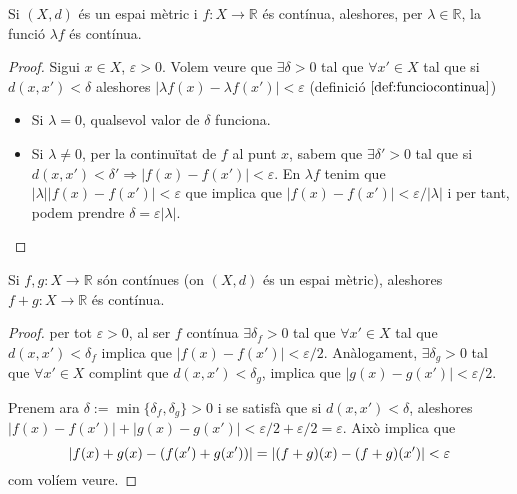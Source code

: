 \documentclass[../main.tex]{subfiles}
\begin{document}
\begin{prop}
\label{prop:funciocontinuaperescalar} Si $(X,d)$ és un espai mètric i $f:X\rightarrow \mathbb{R}$ és contínua, aleshores, per $\lambda\in\mathbb{R}$, la funció $\lambda f$ és contínua.
\end{prop}
\begin{proof}
Sigui $x\in X$, $\varepsilon>0$. Volem veure que $\exists\delta>0$ tal que $\forall x'\in X$ tal que si $d(x,x')<\delta$ aleshores $|\lambda f(x)-\lambda f(x')|<\varepsilon$ (definició $\ref{def:funciocontinua}$)
\begin{itemize}
    \item Si $\lambda = 0$, qualsevol valor de $\delta$ funciona.
    \item Si $\lambda\not = 0$, per la continuïtat de $f$ al punt $x$, sabem que $\exists\delta'>0$ tal que si $d(x,x')<\delta'\Rightarrow |f(x)-f(x')|<\varepsilon$. En $\lambda f$ tenim que $|\lambda||f(x)-f(x')|<\varepsilon$ que implica que $|f(x)-f(x')|<\varepsilon/|\lambda|$ i per tant, podem prendre $\delta = \varepsilon|\lambda|$.
\end{itemize}
\end{proof}

\begin{prop}
\label{prop:sumadefuncionscontinues} Si $f,g:X\rightarrow \mathbb{R}$ són contínues (on $(X,d)$ és un espai mètric), aleshores $f+g:X\rightarrow \mathbb{R}$ és contínua.
\end{prop}
\begin{proof}
per tot $\varepsilon>0$, al ser $f$ contínua $\exists\delta_f>0$ tal que $\forall x'\in X$ tal que $d(x,x')<\delta_f$ implica que $|f(x)-f(x')|<\varepsilon/2$. Anàlogament, $\exists \delta_g>0$ tal que $\forall x'\in X$ complint que $d(x,x')<\delta_g$, implica que $|g(x)-g(x')|<\varepsilon/2$.

Prenem ara $\delta:=\min\{\delta_f,\delta_g\}>0$ i se satisfà que si $d(x,x')<\delta$, aleshores $|f(x)-f(x')|+|g(x)-g(x')|<\varepsilon/2 + \varepsilon/2 = \varepsilon$. Això implica que
\begin{equation}
    \notag
    |f(x)+g(x) - (f(x')+g(x'))| = |(f+g)(x)-(f+g)(x')|<\varepsilon
\end{equation}
com volíem veure.
\end{proof}
\end{document}
